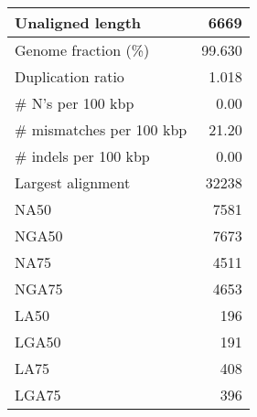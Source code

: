 \documentclass[12pt,a4paper]{article}
\begin{document}
\begin{table}[ht]
\begin{center}
\begin{tabular}{|l*{1}{|r}|}
Unaligned length & 6669 \\ \hline
Genome fraction (\%) & 99.630 \\ \hline
Duplication ratio & 1.018 \\ \hline
\# N's per 100 kbp & 0.00 \\ \hline
\# mismatches per 100 kbp & 21.20 \\ \hline
\# indels per 100 kbp & 0.00 \\ \hline
Largest alignment & 32238 \\ \hline
NA50 & 7581 \\ \hline
NGA50 & 7673 \\ \hline
NA75 & 4511 \\ \hline
NGA75 & 4653 \\ \hline
LA50 & 196 \\ \hline
LGA50 & 191 \\ \hline
LA75 & 408 \\ \hline
LGA75 & 396 \\ \hline
\end{tabular}
\end{center}
\end{table}
\end{document}
